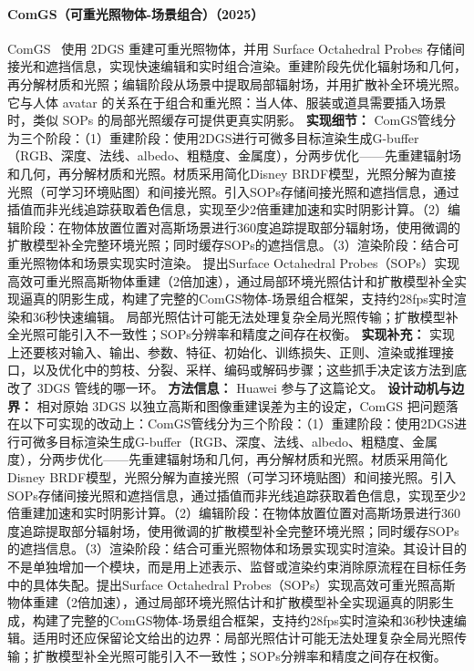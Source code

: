 \paragraph{ComGS（可重光照物体-场景组合）（2025）}
ComGS~\cite{2510_07729} 使用 2DGS 重建可重光照物体，并用 Surface Octahedral Probes 存储间接光和遮挡信息，实现快速编辑和实时组合渲染。重建阶段先优化辐射场和几何，再分解材质和光照；编辑阶段从场景中提取局部辐射场，并用扩散补全环境光照。它与人体 avatar 的关系在于组合和重光照：当人体、服装或道具需要插入场景时，类似 SOPs 的局部光照缓存可提供更真实阴影。
\textbf{实现细节：} ComGS管线分为三个阶段：（1）重建阶段：使用2DGS进行可微多目标渲染生成G-buffer（RGB、深度、法线、albedo、粗糙度、金属度），分两步优化——先重建辐射场和几何，再分解材质和光照。材质采用简化Disney BRDF模型，光照分解为直接光照（可学习环境贴图）和间接光照。引入SOPs存储间接光照和遮挡信息，通过插值而非光线追踪获取着色信息，实现至少2倍重建加速和实时阴影计算。（2）编辑阶段：在物体放置位置对高斯场景进行360度追踪提取部分辐射场，使用微调的扩散模型补全完整环境光照；同时缓存SOPs的遮挡信息。（3）渲染阶段：结合可重光照物体和场景实现实时渲染。 提出Surface Octahedral Probes（SOPs）实现高效可重光照高斯物体重建（2倍加速），通过局部环境光照估计和扩散模型补全实现逼真的阴影生成，构建了完整的ComGS物体-场景组合框架，支持约28fps实时渲染和36秒快速编辑。 局部光照估计可能无法处理复杂全局光照传输；扩散模型补全光照可能引入不一致性；SOPs分辨率和精度之间存在权衡。
\textbf{实现补充：} 实现上还要核对输入、输出、参数、特征、初始化、训练损失、正则、渲染或推理接口，以及优化中的剪枝、分裂、采样、编码或解码步骤；这些抓手决定该方法到底改了 3DGS 管线的哪一环。
\textbf{方法信息：} Huawei 参与了这篇论文。
\textbf{设计动机与边界：} 相对原始 3DGS 以独立高斯和图像重建误差为主的设定，ComGS 把问题落在以下可实现的改动上：ComGS管线分为三个阶段：（1）重建阶段：使用2DGS进行可微多目标渲染生成G-buffer（RGB、深度、法线、albedo、粗糙度、金属度），分两步优化——先重建辐射场和几何，再分解材质和光照。材质采用简化Disney BRDF模型，光照分解为直接光照（可学习环境贴图）和间接光照。引入SOPs存储间接光照和遮挡信息，通过插值而非光线追踪获取着色信息，实现至少2倍重建加速和实时阴影计算。（2）编辑阶段：在物体放置位置对高斯场景进行360度追踪提取部分辐射场，使用微调的扩散模型补全完整环境光照；同时缓存SOPs的遮挡信息。（3）渲染阶段：结合可重光照物体和场景实现实时渲染。其设计目的不是单独增加一个模块，而是用上述表示、监督或渲染约束消除原流程在目标任务中的具体失配。提出Surface Octahedral Probes（SOPs）实现高效可重光照高斯物体重建（2倍加速），通过局部环境光照估计和扩散模型补全实现逼真的阴影生成，构建了完整的ComGS物体-场景组合框架，支持约28fps实时渲染和36秒快速编辑。适用时还应保留论文给出的边界：局部光照估计可能无法处理复杂全局光照传输；扩散模型补全光照可能引入不一致性；SOPs分辨率和精度之间存在权衡。
